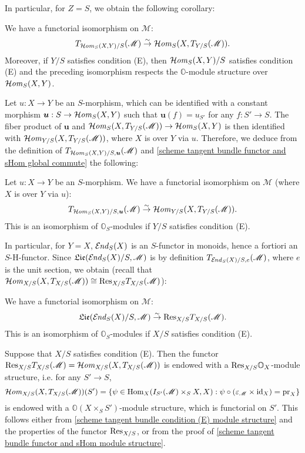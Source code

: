 In particular, for $Z=S$, we obtain the following corollary:
\begin{corollary}\label{scheme tangent bundle functor and sHom global commute}
We have a functorial isomorphism on $\mathscr{M}$:
\[T_{\operatorname{\mathcal{H}\hspace*{-0.4pt}\textit{om}\hspace{0.5pt}}_S(X,Y)/S}(\mathscr{M})\stackrel{\sim}{\to} \operatorname{\mathcal{H}\hspace*{-0.4pt}\textit{om}\hspace{0.5pt}}_S(X,T_{Y/S}(\mathscr{M})).\]
Moreover, if $Y/S$ satisfies condition (E), then $\operatorname{\mathcal{H}\hspace*{-0.4pt}\textit{om}\hspace{0.5pt}}_S(X,Y)/S$ satisfies condition (E) and the preceding isomorphism respects the $\mathbb{O}$-module structure over $\operatorname{\mathcal{H}\hspace*{-0.4pt}\textit{om}\hspace{0.5pt}}_S(X,Y)$.
\end{corollary}

Let $u:X\to Y$ be an $S$-morphism, which can be identified with a constant morphism $\bm{u}:S\to\operatorname{\mathcal{H}\hspace*{-0.4pt}\textit{om}\hspace{0.5pt}}_S(X,Y)$ such that $\bm{u}(f)=u_{S'}$ for any $f:S'\to S$. The fiber product of $\bm{u}$ and $\operatorname{\mathcal{H}\hspace*{-0.4pt}\textit{om}\hspace{0.5pt}}_S(X,T_{Y/S}(\mathscr{M}))\to\operatorname{\mathcal{H}\hspace*{-0.4pt}\textit{om}\hspace{0.5pt}}_S(X,Y)$ is then identified with $\operatorname{\mathcal{H}\hspace*{-0.4pt}\textit{om}\hspace{0.5pt}}_{Y/S}(X,T_{Y/S}(\mathscr{M}))$, where $X$ is over $Y$ via $u$. Therefore, we deduce from the definition of $T_{\operatorname{\mathcal{H}\hspace*{-0.4pt}\textit{om}\hspace{0.5pt}}_S(X,Y)/S,\bm{u}}(\mathscr{M})$ and \cref{scheme tangent bundle functor and sHom global commute} the following:

\begin{corollary}\label{scheme tangent bundle fiber and sHom commute}
Let $u:X\to Y$ be an $S$-morphism. We have a functorial isomorphism on $\mathscr{M}$ (where $X$ is over $Y$ via $u$):
\[T_{\operatorname{\mathcal{H}\hspace*{-0.4pt}\textit{om}\hspace{0.5pt}}_S(X,Y)/S,\bm{u}}(\mathscr{M})\stackrel{\sim}{\to} \operatorname{\mathcal{H}\hspace*{-0.4pt}\textit{om}\hspace{0.5pt}}_{Y/S}(X,T_{Y/S}(\mathscr{M})).\]
This is an isomorphism of $\mathbb{O}_S$-modules if $Y/S$ satisfies condition (E).
\end{corollary}

In particular, for $Y=X$, $\operatorname{\mathcal{E}\hspace*{-1pt}\textit{nd}\hspace{0.5pt}}_S(X)$ is an $S$-functor in monoids, hence a fortiori an $S$-H-functor. Since $\mathfrak{Lie}(\operatorname{\mathcal{E}\hspace*{-1pt}\textit{nd}\hspace{0.5pt}}_S(X)/S,\mathscr{M})$ is by definition $T_{\operatorname{\mathcal{E}\hspace*{-1pt}\textit{nd}\hspace{0.5pt}}_S(X)/S,e}(\mathscr{M})$, where $e$ is the unit section, we obtain (recall that $\operatorname{\mathcal{H}\hspace*{-0.4pt}\textit{om}\hspace{0.5pt}}_{X/S}(X,T_{X/S}(\mathscr{M}))\cong\mathrm{Res}_{X/S}T_{X/S}(\mathscr{M})$):

\begin{corollary}\label{scheme tangent bundle Lie and Weil restriction isomorphism}
We have a functorial isomorphism on $\mathscr{M}$:
\[\mathfrak{Lie}(\operatorname{\mathcal{E}\hspace*{-1pt}\textit{nd}\hspace{0.5pt}}_S(X)/S,\mathscr{M})\stackrel{\sim}{\to}\mathrm{Res}_{X/S}T_{X/S}(\mathscr{M}).\]
This is an isomorphism of $\mathbb{O}_S$-modules if $X/S$ satisfies condition (E).
\end{corollary}

\begin{remark}\label{scheme tangent bundle Weil restriction module structure}
Suppose that $X/S$ satisfies condition (E). Then the functor $\mathrm{Res}_{X/S}T_{X/S}(\mathscr{M})=\operatorname{\mathcal{H}\hspace*{-0.4pt}\textit{om}\hspace{0.5pt}}_{X/S}(X,T_{X/S}(\mathscr{M}))$ is endowed with a $\mathrm{Res}_{X/S}\mathbb{O}_X$-module structure, i.e. for any $S'\to S$,
\[\operatorname{\mathcal{H}\hspace*{-0.4pt}\textit{om}\hspace{0.5pt}}_{X/S}(X,T_{X/S}(\mathscr{M}))(S')=\{\psi\in\mathrm{Hom}_X(I_{S'}(\mathscr{M})\times_SX,X):\psi\circ(\varepsilon_\mathscr{M}\times\operatorname{id}_X)=\mathrm{pr}_X\}\]
is endowed with a $\mathbb{O}(X\times_SS')$-module structure, which is functorial on $S'$. This follows either from \cref{scheme tangent bundle condition (E) module structure} and the properties of the functor $\mathrm{Res}_{X/S}$, or from the proof of \cref{scheme tangent bundle functor and sHom module structure}.
\end{remark}

